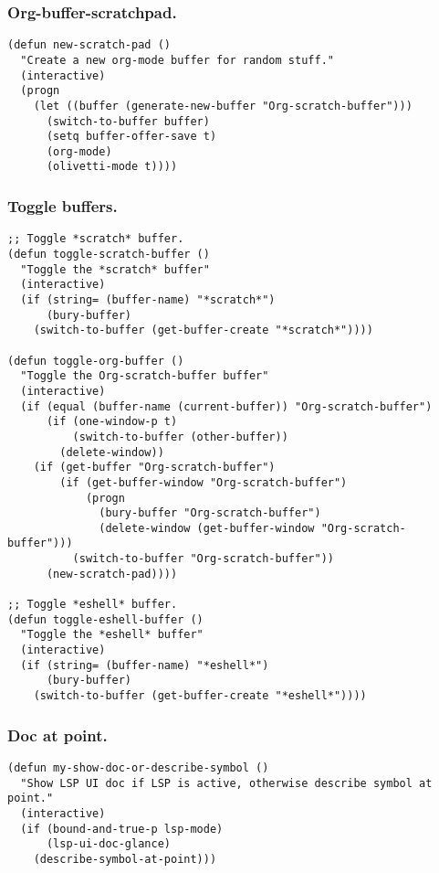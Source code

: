 \documentclass[11pt]{article}
\begin{document}
\subsubsection{Org-buffer-scratchpad.}
\label{sec:orgdea84d8}
\begin{verbatim}
(defun new-scratch-pad ()
  "Create a new org-mode buffer for random stuff."
  (interactive)
  (progn
    (let ((buffer (generate-new-buffer "Org-scratch-buffer")))
      (switch-to-buffer buffer)
      (setq buffer-offer-save t)
      (org-mode)
      (olivetti-mode t))))
\end{verbatim}
\subsubsection{Toggle buffers.}
\label{sec:orgab83a1e}
\begin{verbatim}
;; Toggle *scratch* buffer.
(defun toggle-scratch-buffer ()
  "Toggle the *scratch* buffer"
  (interactive)
  (if (string= (buffer-name) "*scratch*")
      (bury-buffer)
    (switch-to-buffer (get-buffer-create "*scratch*"))))

(defun toggle-org-buffer ()
  "Toggle the Org-scratch-buffer buffer"
  (interactive)
  (if (equal (buffer-name (current-buffer)) "Org-scratch-buffer")
      (if (one-window-p t)
          (switch-to-buffer (other-buffer))
        (delete-window))
    (if (get-buffer "Org-scratch-buffer")
        (if (get-buffer-window "Org-scratch-buffer")
            (progn
              (bury-buffer "Org-scratch-buffer")
              (delete-window (get-buffer-window "Org-scratch-buffer")))
          (switch-to-buffer "Org-scratch-buffer"))
      (new-scratch-pad))))

;; Toggle *eshell* buffer.
(defun toggle-eshell-buffer ()
  "Toggle the *eshell* buffer"
  (interactive)
  (if (string= (buffer-name) "*eshell*")
      (bury-buffer)
    (switch-to-buffer (get-buffer-create "*eshell*"))))
\end{verbatim}
\subsubsection{Doc at point.}
\label{sec:org031f1aa}
\begin{verbatim}
(defun my-show-doc-or-describe-symbol ()
  "Show LSP UI doc if LSP is active, otherwise describe symbol at point."
  (interactive)
  (if (bound-and-true-p lsp-mode)
      (lsp-ui-doc-glance)
    (describe-symbol-at-point)))
\end{verbatim}
\end{document}
